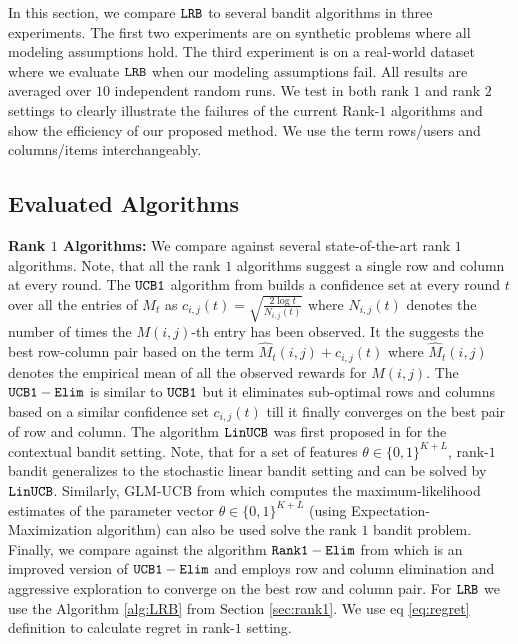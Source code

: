 In this section, we compare ${\tt LRB}$ to several bandit algorithms in three experiments. The first two experiments are on synthetic problems where all modeling assumptions hold. The third experiment is on a real-world dataset where we evaluate ${\tt LRB}$ when our modeling assumptions fail. All results are averaged over $10$ independent random runs. We test in both rank $1$ and rank $2$ settings to clearly illustrate the failures of the current Rank-$1$ algorithms and show the efficiency of our proposed method. We use the term rows/users and columns/items interchangeably. 

\subsection{Evaluated Algorithms}

\textbf{Rank $1$ Algorithms:} We compare against several state-of-the-art rank $1$ algorithms. Note, that all the rank $1$ algorithms suggest a single row and column at every round. The ${\tt UCB1}$ algorithm from \citet{auer2002finite} builds a confidence set at every round $t$ over all the entries of $M_t$ as $c_{i, j}(t) = \sqrt{\frac{2\log t}{N_{i, j}(t)}}$ where $N_{i, j}(t)$ denotes the number of times the $M(i,j)$-th entry has been observed. It the suggests the best row-column pair based on the term $\hat{M}_{t}(i,j) + c_{i, j}(t)$ where $\hat{M}_{t}(i,j)$ denotes the empirical mean of all the observed rewards for $M(i,j)$. The ${\tt UCB1-Elim}$  \citep{auer2010ucb} is similar to ${\tt UCB1}$ but it eliminates sub-optimal rows and columns  based on a similar confidence set  $c_{i, j}(t)$ till it finally converges on the best pair of row and column. The algorithm ${\tt LinUCB}$ was first proposed in \citet{li2010contextual} for the contextual bandit setting. Note, that for a set of features $\theta \in \{0,1\}^{K+L}$, rank-$1$ bandit generalizes to the stochastic linear bandit setting and can be solved by ${\tt LinUCB}$.  Similarly, GLM-UCB from  \citet{filippi2010parametric} which computes the maximum-likelihood estimates of the parameter vector $\theta \in \{0,1\}^{K+L}$ (using Expectation-Maximization algorithm) can also be used solve the rank $1$ bandit problem. Finally, we compare against the algorithm $\tt Rank1-Elim$ from \citet{katariya2016stochastic} which is an improved version of ${\tt UCB1-Elim}$ and employs row and column elimination and aggressive exploration to converge on the best row and column pair. For ${\tt LRB}$ we use the Algorithm \ref{alg:LRB} from Section \ref{sec:rank1}. We use eq \eqref{eq:regret} definition to calculate regret in rank-$1$ setting.


